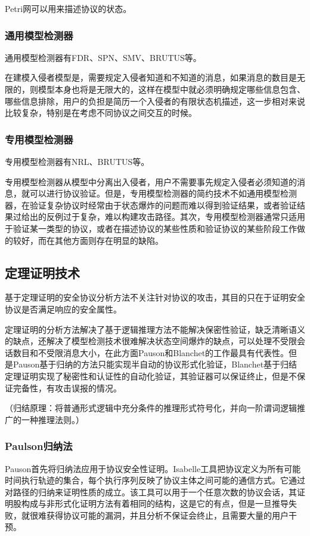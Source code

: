 \documentclass[cs4size,a4pape,UTF8]{ctexart}
\numberwithin{equation}{section}
\numberwithin{table}{section}
\numberwithin{figure}{section}
\begin{document}
Petri网可以用来描述协议的状态。

\subsubsection{通用模型检测器}
通用模型检测器有FDR、SPN、SMV、BRUTUS等。

在建模入侵者模型是，需要规定入侵者知道和不知道的消息，如果消息的数目是无限的，则模型本身也将是无限大的，这样在模型中就必须明确规定哪些信息包含、哪些信息排除，用户的负担是简历一个入侵者的有限状态机描述，这一步相对来说比较复杂，特别是在考虑不同协议之间交互的时候\cite{3}。

\subsubsection{专用模型检测器}
专用模型检测器有NRL、BRUTUS等。

专用模型检测器从模型中分离出入侵者，用户不需要事先规定入侵者必须知道的消息，就可以进行协议验证。但是，专用模型检测器的简约技术不如通用模型检测器，在验证复杂协议时经常由于状态爆炸的问题而难以得到验证结果，或者验证结果过给出的反例过于复杂，难以构建攻击路径。其次，专用模型检测器通常只适用于验证某一类型的协议，或者在描述协议的某些性质和验证协议的某些阶段工作做的较好，而在其他方面则存在明显的缺陷\cite{3}。


\subsection{定理证明技术}
基于定理证明的安全协议分析方法不关注针对协议的攻击，其目的只在于证明安全协议是否满足响应的安全属性。

定理证明的分析方法解决了基于逻辑推理方法不能解决保密性验证，缺乏清晰语义的缺点，还解决了模型检测技术很难解决状态空间爆炸的缺点，可以处理不受限会话数目和不受限消息大小，在此方面Pauson和Blanchet的工作最具有代表性。但是Pauson基于归纳的方法只能实现半自动的协议形式化验证，Blanchet基于归结定理证明实现了秘密性和认证性的自动化验证，其验证器可以保证终止，但是不保证完备性，有攻击误报的情况\cite{6}。

（归结原理：将普通形式逻辑中充分条件的推理形式符号化，并向一阶谓词逻辑推广的一种推理法则。）

\subsubsection{Paulson归纳法}
Pauson首先将归纳法应用于协议安全性证明。Isabelle工具把协议定义为所有可能时间执行轨迹的集合，每个执行序列反映了协议主体之间可能的通信方式。它通过对路径的归纳来证明性质的成立。该工具可以用于一个任意次数的协议会话，其证明股构成与非形式化证明方法有着相同的结构，这是它的有点，但是一旦推导失败，就很难获得协议可能的漏洞，并且分析不保证会终止，且需要大量的用户干预\cite{6}。
\end{document}
